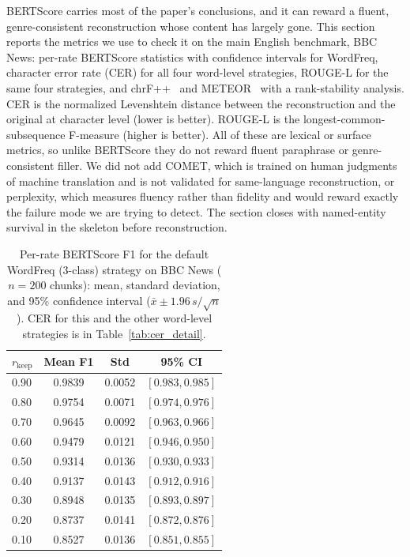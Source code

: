 \documentclass[11pt]{article}
\newcommand{\rkeep}{r_{\mathrm{keep}}}
\begin{document}
BERTScore carries most of the paper's conclusions, and it can reward a fluent, genre-consistent
reconstruction whose content has largely gone. This section reports the metrics we use to check it on the
main English benchmark, BBC News: per-rate BERTScore statistics with confidence intervals for WordFreq, character error rate (CER) for all four word-level strategies, ROUGE-L for the same four strategies, and chrF++~\citep{popovic2017chrf} and METEOR~\citep{banerjee2005meteor} with a rank-stability analysis. CER is
the normalized Levenshtein distance between the reconstruction and the original at character level (lower is better). ROUGE-L is the longest-common-subsequence F-measure (higher is better). All of these are
lexical or surface metrics, so unlike BERTScore they do not reward fluent paraphrase or genre-consistent
filler. We did not add COMET, which is trained on human judgments of machine translation and is not
validated for same-language reconstruction, or perplexity, which measures fluency rather than fidelity and
would reward exactly the failure mode we are trying to detect.  The section closes with named-entity survival in the skeleton before reconstruction.

\begin{table}[tbp]
\centering
\small
\caption{Per-rate BERTScore F1 for the default WordFreq (3-class) strategy on BBC News ($n{=}200$ chunks):
mean, standard deviation, and 95\% confidence interval ($\bar{x} \pm 1.96\, s/\sqrt{n}$). CER for this and the
other word-level strategies is in Table~\ref{tab:cer_detail}.}
\label{tab:wordfreq_detail}
\begin{tabular}{lccc}
\toprule
$\rkeep$ & Mean F1 & Std & 95\% CI \\
\midrule
0.90 & 0.9839 & 0.0052 & $[0.983, 0.985]$ \\
0.80 & 0.9754 & 0.0071 & $[0.974, 0.976]$ \\
0.70 & 0.9645 & 0.0092 & $[0.963, 0.966]$ \\
0.60 & 0.9479 & 0.0121 & $[0.946, 0.950]$ \\
0.50 & 0.9314 & 0.0136 & $[0.930, 0.933]$ \\
0.40 & 0.9137 & 0.0143 & $[0.912, 0.916]$ \\
0.30 & 0.8948 & 0.0135 & $[0.893, 0.897]$ \\
0.20 & 0.8737 & 0.0141 & $[0.872, 0.876]$ \\
0.10 & 0.8527 & 0.0136 & $[0.851, 0.855]$ \\
\bottomrule
\end{tabular}
\end{table}
\end{document}
